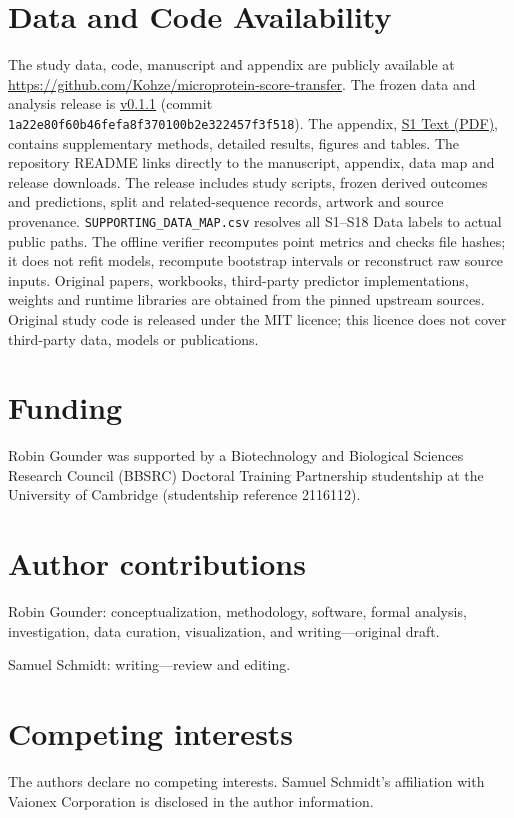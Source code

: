 \documentclass[11pt,a4paper]{article}
\begin{document}
\section*{Data and Code Availability}
The study data, code, manuscript and appendix are publicly available at
\url{https://github.com/Kohze/microprotein-score-transfer}.
The frozen data and analysis release is
\href{https://github.com/Kohze/microprotein-score-transfer/releases/tag/v0.1.1}{v0.1.1}
(commit \texttt{1a22e80f60b46fefa8f370100b2e322457f3f518}).
The appendix, \href{https://github.com/Kohze/microprotein-score-transfer/blob/v0.1.1/paper/S1_Text.pdf}{S1 Text (PDF)},
contains supplementary methods, detailed results, figures and tables. The repository README links
directly to the manuscript, appendix, data map and release downloads.
The release includes study scripts, frozen derived outcomes and predictions,
split and related-sequence records, artwork and source provenance. \texttt{SUPPORTING\_DATA\_MAP.csv} resolves
all S1--S18 Data labels to actual public paths. The offline verifier
recomputes point metrics and checks file hashes; it does not refit models,
recompute bootstrap intervals or reconstruct raw source inputs.
Original papers, workbooks, third-party predictor implementations, weights
and runtime libraries are obtained from the pinned upstream sources.
Original study code is released under the MIT licence; this licence does
not cover third-party data, models or publications.

\section*{Funding}
Robin Gounder was supported by a Biotechnology and Biological Sciences
Research Council (\mbox{BBSRC}) Doctoral Training Partnership studentship at the
University of Cambridge (studentship reference 2116112).

\section*{Author contributions}
Robin Gounder: conceptualization, methodology, software, formal analysis,
investigation, data curation, visualization, and writing---original draft.
\par Samuel Schmidt: writing---review and editing.

\section*{Competing interests}
The authors declare no competing interests. Samuel Schmidt's affiliation
with Vaionex Corporation is disclosed in the author information.
\end{document}
